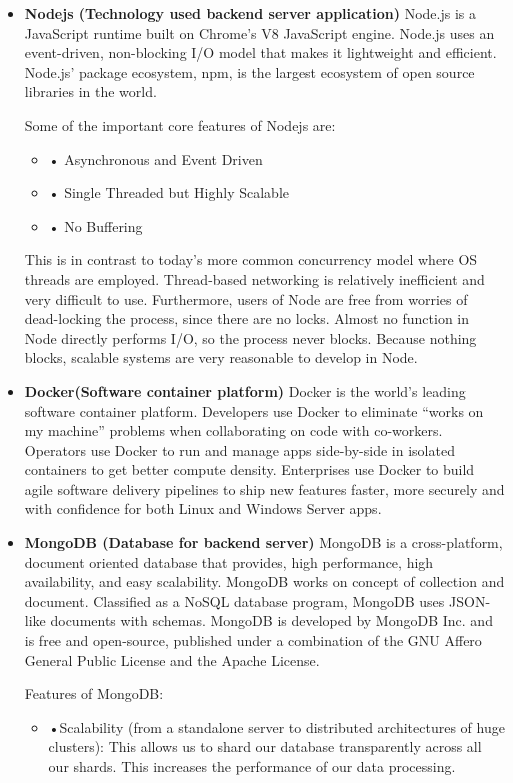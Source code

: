 \begin{itemize}


\item	\textbf{Nodejs (Technology used backend server application) }
Node.js is a JavaScript runtime built on Chrome's V8 JavaScript engine. Node.js uses an event-driven, non-blocking I/O model that makes it lightweight and efficient. Node.js' package ecosystem, npm, is the largest ecosystem of open source libraries in the world.

Some of the important core features of Nodejs are:
\begin{itemize}
\item	• Asynchronous and Event Driven

\item •	Single Threaded but Highly Scalable

\item •	No Buffering
\end{itemize}

This is in contrast to today's more common concurrency model where OS threads are employed. Thread-based networking is relatively inefficient and very difficult to use. Furthermore, users of Node are free from worries of dead-locking the process, since there are no locks. Almost no function in Node directly performs I/O, so the process never blocks. Because nothing blocks, scalable systems are very reasonable to develop in Node.

\item	\textbf{Docker(Software container platform) }
Docker is the world’s leading software container platform. Developers use Docker to eliminate “works on my machine” problems when collaborating on code with co-workers. Operators use Docker to run and manage apps side-by-side in isolated containers to get better compute density. Enterprises use Docker to build agile software delivery pipelines to ship new features faster, more securely and with confidence for both Linux and Windows Server apps.
\item	\textbf{MongoDB (Database for backend server) }
MongoDB is a cross-platform, document oriented database that provides, high performance, high availability, and easy scalability. MongoDB works on concept of collection and document. Classified as a NoSQL database program, MongoDB uses JSON-like documents with schemas. MongoDB is developed by MongoDB Inc. and is free and open-source, published under a combination of the GNU Affero General Public License and the Apache License.

Features of MongoDB:
\begin{itemize}
\item •Scalability (from a standalone server to distributed architectures of huge clusters): This allows us to shard our database transparently across all our shards. This increases the performance of our data processing.


\end{itemize}
\end{itemize}

